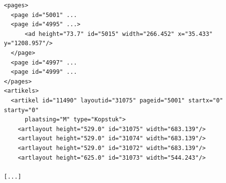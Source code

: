 \documentclass[a4paper,12pt]{report}
\begin{document}
\begin{listing}
	\begin{verbatim}
<pages>
  <page id="5001" ...
  <page id="4995" ...>
      <ad height="73.7" id="5015" width="266.452" x="35.433" y="1208.957"/>
  </page>
  <page id="4997" ...
  <page id="4999" ...
</pages>
<artikels>
  <artikel id="11490" layoutid="31075" pageid="5001" startx="0" starty="0"
  	  plaatsing="M" type="Kopstuk">
    <artlayout height="529.0" id="31075" width="683.139"/>
    <artlayout height="529.0" id="31074" width="683.139"/>
    <artlayout height="529.0" id="31072" width="683.139"/>
    <artlayout height="625.0" id="31073" width="544.243"/>

[...]
	\end{verbatim}
  \caption{Resultaat in XML, bemerk de toevoeging van layoutId, startX en startY.}
  \label{listing:uitvoerxml}
\end{listing}
\end{document}
